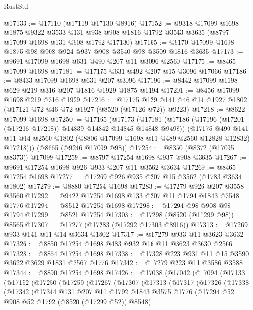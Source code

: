 \begin{lexlean}{RustStd}
\begin{coremodule}
@17133 := @17110 (@17119 @17130 @8916)
@17152 := @9318
    @17099
    @1698
    @1875
    @9322
    @3533
    @131
    @938
    @908
    @1816
    @1792
    @3543
    @3635
    (@8797 @17099 @1698 @131 @908 @1792 @17130)
@17165 := @9170 @17099 @1698 @1875 @98 @908 @924 @937 @908 @3540 @98 @3509 @1816 @3635
@17173 := @9691 @17099 @1698 @631 @490 @207 @11 @3096 @2560
@17175 := @8465 @17099 @1698
@17181 := @17175 @631 @492 @207 @15 @3096 @17066
@17186 := @8433 @17099 @1698 @631 @207 @3096
@17196 := @8442 @17099 @1698 @629 @219 @316 @207 @1816 @1929 @1875 @1194
@17201 := @8456 @17099 @1698 @219 @316 @1929
@17216 := @17175 @129 @141 @46 @14 @1927 @1802 (@17121 @72 @46 @72 @1927 (@8520 (@17126 @72)) @9223)
@17218 := @8622 @17099 @1698
@17250 := @17165
    (@17173
      (@17181
        (@17186 (@17196 (@17201 (@17216 @17218)) @14839 @14842 @14845 @14848 @9498))
        (@17175
          @490
          @141
          @11
          @14
          @2560
          @1802
          (@8806 @17099 @1698 @11 @489 @2560 @12828 @12832)
          @17218)))
    (@8665 (@9246 @17099 @98))
@17254 := @8350 (@8372 (@17095 @8373)) @17099
@17259 := @8797 @17254 @1698 @937 @908 @3635
@17267 := @9691 @17254 @1698 @926 @933 @207 @11 @3562 @3634
@17269 := @8465 @17254 @1698
@17277 := @17269 @926 @935 @207 @15 @3562 (@1783 @3634 @1802)
@17279 := @8880 @17254 @1698
@17283 := @17279 @926 @207 @3558 @3560
@17292 := @9422 @17254 @1698 @133 @207 @11 @1794 @1843 @3548 @1776
@17294 := @8512 @17254 @1698
@17298 := @17294 @98 @908 @98 @1794
@17299 := @8521 @17254
@17303 := @17298 (@8520 (@17299 @98)) @8565
@17307 := @17277 (@17283 (@17292 @17303 @8916))
@17313 := @17269 @933 @141 @11 @14 @3634 @1802
@17317 := @17279 @933 @11 @3623 @3632
@17326 := @8850 @17254 @1698 @483 @932 @16 @11 @3623 @3630 @2566
@17328 := @8864 @17254 @1698
@17338 := @17328 @223 @931 @11 @15 @3590 @3622 @3629 @1831 @3567 @1776
@17342 := @17279 @223 @11 @3586 @3588
@17344 := @8890 @17254 @1698
@17426 := @17038
    (@17042
      (@17094
        (@17133
          (@17152
            (@17250
              (@17259
                (@17267
                  (@17307
                    (@17313
                      (@17317
                        (@17326
                          (@17338
                            (@17342
                              (@17344
                                @131
                                @207
                                @11
                                @1792
                                @1843
                                @3575
                                @1776
                                (@17294 @52 @908 @52 @1792 (@8520 (@17299 @52)) @8548)

\end{coremodule}
\end{lexlean}
